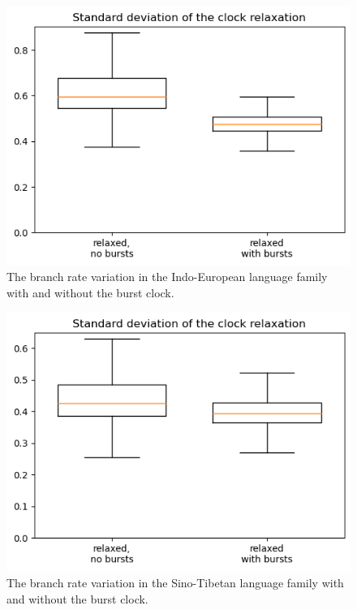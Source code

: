 \documentclass[a4paper]{article}
\begin{document}
\begin{figure}
    \centering
    \includegraphics{supplement/analysis/indoeuropean_clockrates.png}
    \caption{The branch rate variation in the Indo-European language family with and without the burst clock.}
    \label{fig:rate_variation:indoeuropean}
\end{figure}

\begin{figure}
    \centering
    \includegraphics{supplement/analysis/sinotibetan_clockrates.png}
    \caption{The branch rate variation in the Sino-Tibetan language family with and without the burst clock.}
    \label{fig:rate_variation:sinotibetan}
\end{figure}
\end{document}
